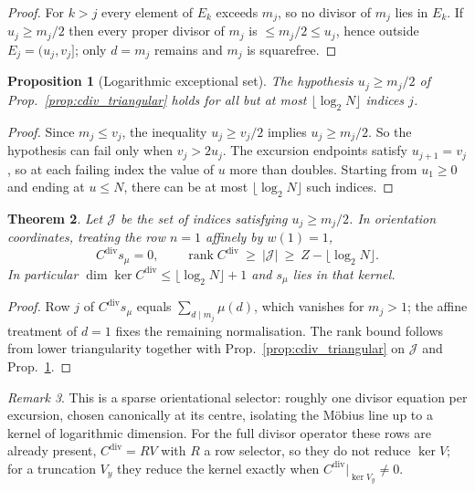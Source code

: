 \documentclass[11pt]{amsart}
\numberwithin{equation}{section}
\theoremstyle{plain}
\newtheorem{theorem}{Theorem}[section]
\newtheorem{proposition}[theorem]{Proposition}
\theoremstyle{definition}
\theoremstyle{remark}
\newtheorem{remark}[theorem]{Remark}
\DeclareMathOperator{\rank}{rank}
\begin{document}
\begin{proof}
For $k>j$ every element of $E_k$ exceeds $m_j$, so no divisor of $m_j$
lies in $E_k$. If $u_j\ge m_j/2$ then every proper divisor of $m_j$ is
$\le m_j/2\le u_j$, hence outside $E_j=(u_j,v_j]$; only $d=m_j$ remains
and $m_j$ is squarefree.
\end{proof}

\begin{proposition}[Logarithmic exceptional set]
\label{prop:log_exceptional}
The hypothesis $u_j\ge m_j/2$ of Prop.~\ref{prop:cdiv_triangular} holds
for all but at most $\lfloor\log_2N\rfloor$ indices $j$.
\end{proposition}

\begin{proof}
Since $m_j\le v_j$, the inequality $u_j\ge v_j/2$ implies
$u_j\ge m_j/2$. So the hypothesis can fail only when $v_j>2u_j$. The
excursion endpoints satisfy $u_{j+1}=v_j$, so at each failing index the
value of $u$ more than doubles. Starting from $u_1\ge0$ and ending at
$u\le N$, there can be at most $\lfloor\log_2N\rfloor$ such indices.
\end{proof}

\begin{theorem}
\label{thm:mobius_line}
Let $\mathcal J$ be the set of indices satisfying $u_j\ge m_j/2$. In
orientation coordinates, treating the row $n=1$ affinely by $w(1)=1$,
\begin{equation}
C^{\mathrm{div}}s_\mu=0,
\qquad
\rank C^{\mathrm{div}}\ \ge\ |\mathcal J|\ \ge\ Z-\lfloor\log_2N\rfloor .
\label{eq:mobius_line}
\end{equation}
In particular $\dim\ker C^{\mathrm{div}}\le\lfloor\log_2N\rfloor+1$ and
$s_\mu$ lies in that kernel.
\end{theorem}

\begin{proof}
Row $j$ of $C^{\mathrm{div}}s_\mu$ equals $\sum_{d\mid m_j}\mu(d)$,
which vanishes for $m_j>1$; the affine treatment of $d=1$ fixes the
remaining normalisation. The rank bound follows from lower
triangularity together with Prop.~\ref{prop:cdiv_triangular} on
$\mathcal J$ and Prop.~\ref{prop:log_exceptional}.
\end{proof}

\begin{remark}
\label{rem:cdiv_meaning}
This is a sparse orientational selector: roughly one divisor equation per
excursion, chosen canonically at its centre, isolating the M\"obius line
up to a kernel of logarithmic dimension. For the full divisor operator
these rows are already present, $C^{\mathrm{div}}=RV$ with $R$ a row
selector, so they do not reduce $\ker V$; for a truncation $V_y$ they
reduce the kernel exactly when
$C^{\mathrm{div}}|_{\ker V_y}\ne0$.
\end{remark}
\end{document}
